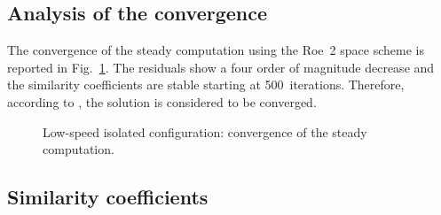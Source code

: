 
\subsection{Analysis of the convergence}
\label{sub:dream_ls_conv_coeff}

The convergence of the steady computation using the Roe~2 space scheme
is reported in Fig.~\ref{fig:dream_ls_convergence_roe2}. The residuals
show a four order of magnitude decrease and the similarity
coefficients are stable starting at 500~iterations.
Therefore, according to \citet{Casey2000}, the
solution is considered to be converged.
\begin{figure}[htp]
  \centering
  \caption{Low-speed isolated configuration: convergence of the steady
  computation.}
  \label{fig:dream_ls_convergence_roe2}
\end{figure}

\subsection{Similarity coefficients}
\label{sub:dream_ls_sim_coeff}

